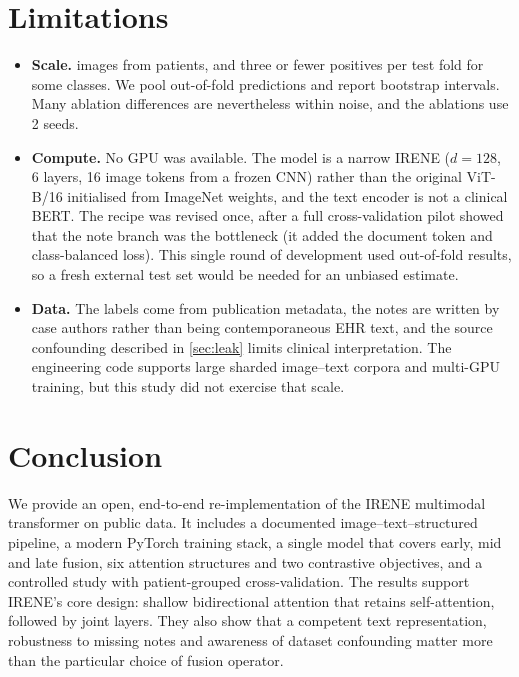 \section{Limitations}
\label{sec:limits}
\begin{itemize}
\item \textbf{Scale.} \NImages{} images from \NPatients{} patients, and three or fewer positives
per test fold for some classes. We pool out-of-fold predictions and report bootstrap intervals.
Many ablation differences are nevertheless within noise, and the ablations use 2 seeds.
\item \textbf{Compute.} No GPU was available. The model is a narrow IRENE ($d{=}128$, 6 layers,
16 image tokens from a frozen CNN) rather than the original ViT-B/16 initialised from ImageNet
weights, and the text encoder is not a clinical BERT. The recipe was revised once, after a full
cross-validation pilot showed that the note branch was the bottleneck (it added the document token
and class-balanced loss). This single round of development used out-of-fold results, so a fresh
external test set would be needed for an unbiased estimate.
\item \textbf{Data.} The labels come from publication metadata, the notes are written by case
authors rather than being contemporaneous EHR text, and the source confounding described in
\cref{sec:leak} limits clinical interpretation. The engineering code supports large sharded
image--text corpora and multi-GPU training, but this study did not exercise that scale.
\end{itemize}

\section{Conclusion}
We provide an open, end-to-end re-implementation of the IRENE multimodal transformer on
public data. It includes a documented image--text--structured pipeline, a modern PyTorch
training stack, a single model that covers early, mid and late fusion, six attention structures
and two contrastive objectives, and a controlled study with patient-grouped cross-validation.
The results support IRENE's core design: shallow bidirectional attention that retains
self-attention, followed by joint layers. They also show that a competent text representation,
robustness to missing notes and awareness of dataset confounding matter more than the
particular choice of fusion operator.
